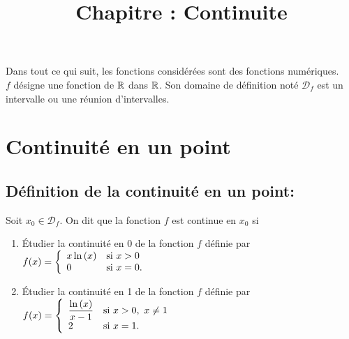 \documentclass[a4paper, 11pt]{article}
\begin{document}
\tableofcontents
\title{Chapitre : Continuite}
\vspace{0.5cm}

\vspace{0.4cm}


\noindent Dans tout ce qui suit, les fonctions consid\'er\'ees sont des fonctions num\'eriques.\\
\noindent $f$ d\'esigne une fonction de $\mathbb{R}$ dans $\mathbb{R}$. Son domaine de d\'efinition not\'e $\mathcal{D}_f$ est un intervalle ou une r\'eunion d'intervalles.

\section{Continuit\'e en un point}
\subsection{D\'efinition de la continuit\'e en un point:}

{\noindent

	\begin{defi}
		Soit $x_0\in\mathcal{D}_f$. On dit que la fonction $f$ est continue en $x_0$ si
		\vspace{1cm}
	\end{defi}

}

{\footnotesize \begin{exercice}
		\begin{enumerate}
			\item \'Etudier la continuit\'e en 0 de la fonction $f$ d\'efinie par $f(x)=\left\lbrace\begin{array}{ll} x\ln{(x)} &\hbox{si}\ x>0\\ 0 & \hbox{si}\ x=0.    \end{array}\right.$\vsec
			\item \'Etudier la continuit\'e en 1 de la fonction $f$ d\'efinie par $f(x)=\left\lbrace\begin{array}{ll} \displaystyle\frac{\ln{(x)}}{x-1} &\hbox{si}\ x>0,\ x\not=1\\ 2 & \hbox{si}\ x=1.    \end{array}\right.$
		\end{enumerate}
	\end{exercice}}
\end{document}
